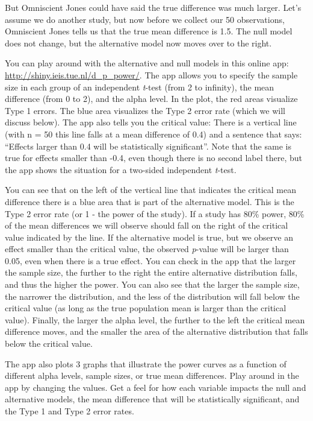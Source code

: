 \documentclass[
  oneside]{book}
\begin{document}
But Omniscient Jones could have said the true difference was much larger. Let's assume we do another study, but now before we collect our 50 observations, Omniscient Jones tells us that the true mean difference is 1.5. The null model does not change, but the alternative model now moves over to the right.

You can play around with the alternative and null models in this online app: \url{http://shiny.ieis.tue.nl/d_p_power/}. The app allows you to specify the sample size in each group of an independent \emph{t}-test (from 2 to infinity), the mean difference (from 0 to 2), and the alpha level. In the plot, the red areas visualize Type 1 errors. The blue area visualizes the Type 2 error rate (which we will discuss below). The app also tells you the critical value: There is a vertical line (with n = 50 this line falls at a mean difference of 0.4) and a sentence that says: ``Effects larger than 0.4 will be statistically significant''. Note that the same is true for effects smaller than -0.4, even though there is no second label there, but the app shows the situation for a two-sided independent \emph{t}-test.

You can see that on the left of the vertical line that indicates the critical mean difference there is a blue area that is part of the alternative model. This is the Type 2 error rate (or 1 - the power of the study). If a study has 80\% power, 80\% of the mean differences we will observe should fall on the right of the critical value indicated by the line. If the alternative model is true, but we observe an effect smaller than the critical value, the observed \emph{p}-value will be larger than 0.05, even when there is a true effect. You can check in the app that the larger the sample size, the further to the right the entire alternative distribution falls, and thus the higher the power. You can also see that the larger the sample size, the narrower the distribution, and the less of the distribution will fall below the critical value (as long as the true population mean is larger than the critical value). Finally, the larger the alpha level, the further to the left the critical mean difference moves, and the smaller the area of the alternative distribution that falls below the critical value.

The app also plots 3 graphs that illustrate the power curves as a function of different alpha levels, sample sizes, or true mean differences. Play around in the app by changing the values. Get a feel for how each variable impacts the null and alternative models, the mean difference that will be statistically significant, and the Type 1 and Type 2 error rates.
\end{document}
